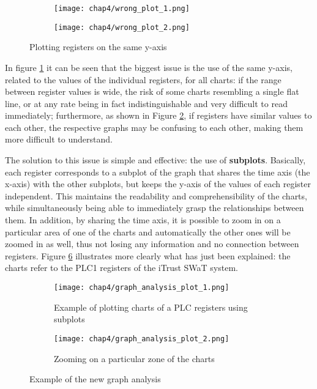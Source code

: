 \begin{figure}[H]
	\centering
	\begin{subfigure}{0.48\textwidth}
		\texttt{[image: chap4/wrong\_plot\_1.png]}
		\caption{}
		\label{subfig:4_wrong_plot}
	\end{subfigure}
	\hfill
	\begin{subfigure}{0.48\textwidth}
		\texttt{[image: chap4/wrong\_plot\_2.png]}
		\caption{}
		\label{subfig:4_wrong_plot_zoom}
	\end{subfigure}
	\caption{Plotting registers on the same y-axis}
	\label{fig:4_plot_comparison_1}
\end{figure}
In figure \ref{subfig:4_wrong_plot} it can be seen that the biggest issue is the use of the same y-axis, related to the values of the individual registers, for all charts: if the range between register values is wide, the risk of some charts resembling a single flat line, or at any rate being in fact indistinguishable and very difficult to read immediately; furthermore, as shown in Figure \ref{subfig:4_wrong_plot_zoom}, if registers have similar values to each other, the respective graphs may be confusing to each other, making them more difficult to understand.

The solution to this issue is simple and effective: the use of \textbf{subplots}. Basically, each register corresponds to a subplot of the graph that shares the time axis (the x-axis) with the other subplots, but keeps the y-axis of the values of each register independent. This maintains the readability and comprehensibility of the charts, while simultaneously being able to immediately grasp the relationships between them. In addition, by sharing the time axis, it is possible to zoom in on a particular area of one of the charts and automatically the other ones will be zoomed in as well, thus not losing any information and no connection between registers. Figure \ref{fig:4_graph_analysis} illustrates more clearly what has just been explained: the charts refer to the PLC1 registers of the iTrust SWaT system.

\begin{figure}[H]
	\centering
	\begin{subfigure}{0.9\textwidth}
		\texttt{[image: chap4/graph\_analysis\_plot\_1.png]}
		\caption{Example of plotting charts of a PLC registers using subplots}
		\label{subfig:4_graph_analysis_1}
	\end{subfigure}
	\hfill
	\begin{subfigure}{0.9\textwidth}
		\texttt{[image: chap4/graph\_analysis\_plot\_2.png]}
		\caption{Zooming on a particular zone of the charts}
		\label{subfig:4_graph_analysis_2}
	\end{subfigure}
	\caption{Example of the new graph analysis}
	\label{fig:4_graph_analysis}
\end{figure}

